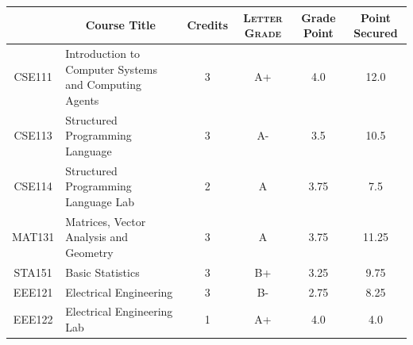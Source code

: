 \documentclass[11pt]{article}
\newcommand*{\numtwo}[1]{\pgfmathprintnumber[
                    fixed, precision=2, fixed zerofill=true]{#1}}
\begin{document}
                \begin{center}
                    \renewcommand{\arraystretch}{1.08}
                    
                \begin{tabular}{|c|l|c|>{\scshape}c|c|c|}
                \hline  \rule[-1ex]{0pt}{3.5ex} {\centering{\bf Course Code}} &  \multicolumn{1}{c|}{\textbf{Course Title}}  & {\bf Credits} & {\bf Letter Grade} & {\bf Grade Point} & {\bf Point Secured}  \\ 
                \hline   CSE111 &  Introduction to Computer Systems and Computing Agents		 & 3 & A+ & 4.0 & 12.0 \\ %
                \hline   CSE113 &  Structured Programming Language		 & 3 & A- & 3.5 & 10.5 \\ %
                \hline   CSE114 &  Structured Programming Language Lab		 & 2 & A & 3.75 & 7.5 \\ %
                \hline   MAT131 &  Matrices, Vector Analysis and Geometry		 & 3 & A & 3.75 & 11.25 \\ %
                \hline   STA151 &  Basic Statistics		 & 3 & B+ & 3.25 & 9.75 \\ %
                \hline   EEE121 &  Electrical Engineering		 & 3 & B- & 2.75 & 8.25 \\ %
                \hline   EEE122 &  Electrical Engineering Lab		 & 1 & A+ & 4.0 & 4.0 \\ %

\hline                %
                \end{tabular}
                \end{center}
                \renewcommand{\arraystretch}{1.03}
\end{document}
